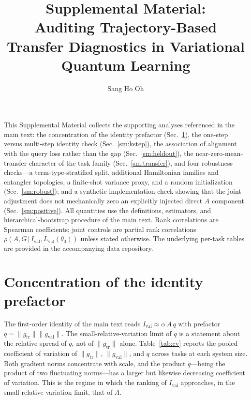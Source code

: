 \documentclass[aps,pra,onecolumn,superscriptaddress,10pt]{revtex4-2}
\newcommand{\Ival}{I_{\mathrm{val}}}
\newcommand{\thetaz}{\theta_0}
\newcommand{\Lval}{L_{\mathrm{val}}}
\newcommand{\gtr}{g_{\mathrm{tr}}}
\newcommand{\gval}{g_{\mathrm{val}}}
\begin{document}
\title{Supplemental Material:\\
Auditing Trajectory-Based Transfer Diagnostics
in Variational Quantum Learning}

\author{Sang Ho Oh}

\maketitle

This Supplemental Material collects the supporting analyses referenced in the main text: the
concentration of the identity prefactor (Sec.~\ref{sm:prefactor}), the one-step versus multi-step
identity check (Sec.~\ref{sm:kstep}), the association of alignment with the query loss rather than
the gap (Sec.~\ref{sm:heldout}), the near-zero-mean-transfer character of the task family
(Sec.~\ref{sm:transfer}), and four robustness checks---a term-type-stratified split, additional
Hamiltonian families and entangler topologies, a finite-shot variance proxy, and a random
initialization (Sec.~\ref{sm:robust}); and a synthetic implementation check showing that the joint adjustment does not mechanically zero an explicitly injected direct $A$ component (Sec.~\ref{sm:positive}). All quantities use the definitions, estimators, and
hierarchical-bootstrap procedure of the main text. Rank correlations are Spearman coefficients; joint
controls are partial rank correlations $\rho(A,G\,|\,\Ival,\Lval(\thetaz))$ unless stated otherwise.
The underlying per-task tables are provided in the accompanying data repository.

\section{Concentration of the identity prefactor}
\label{sm:prefactor}

The first-order identity of the main text reads $\Ival\approx\alpha\,A\,q$ with prefactor
$q=\|\gtr\|\|\gval\|$. The small-relative-variation limit of $q$ is a statement about the
relative spread of $q$, not of $\|\gtr\|$ alone. Table~\ref{tab:cv} reports the pooled coefficient of
variation of $\|\gtr\|$, $\|\gval\|$, and $q$ across tasks at each system size. Both gradient norms
concentrate with scale, and the product $q$---being the product of two fluctuating norms---has a
larger but likewise decreasing coefficient of variation. This is the regime in which the ranking of
$\Ival$ approaches, in the small-relative-variation limit, that of $A$.
\end{document}
